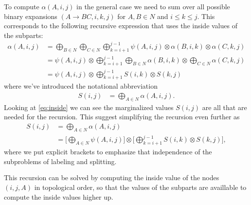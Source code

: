   To compute $\alpha(A, i, j)$ in the general case we need to sum over all possible binary expansions $(A \to B C, i, k, j)$ for $A, B \in N$ and $i \leq k \leq j$. This corresponds to the following recursive expression that uses the inside values of the subparts:
  \begin{align*}
  \label{eq:inside}
    \alpha(A, i, j)
      &= \bigoplus_{B \in N} \bigoplus_{C \in N} \bigoplus_{k=i+1}^{j-1} \psi(A, i, j) \otimes \alpha(B,i,k) \otimes \alpha(C,k,j) \\
      &= \psi(A, i, j) \otimes \bigoplus_{k=i+1}^{j-1} \bigoplus_{B \in N} \alpha(B,i,k) \otimes \bigoplus_{C \in N} \alpha(C,k,j) \\
      &= \psi(A, i, j) \otimes \bigoplus_{k=i+1}^{j-1} S(i,k) \otimes S(k,j)
  \end{align*}
  where we've introduced the notational abbreviation
  \begin{align*}
      S(i,j) &= \bigoplus_{A \in N} \alpha(A,i,j).
  \end{align*}
  Looking at \ref{eq:inside} we can see the marginalized values $S(i, j)$ are all that are needed for the recursion. This suggest simplifying the recursion even further as
  \begin{align*}
  \label{eq:inside-simplified}
    S(i, j)
      &= \bigoplus_{A \in N} \alpha(A,i,j) \\
      &= \Bigg[ \bigoplus_{A \in N} \psi(A, i, j) \Bigg] \otimes \Bigg[\bigoplus_{k=i+1}^{j-1} S(i,k) \otimes  S(k,j) \Bigg],
  \end{align*}
  where we put explicit brackets to emphasize that independence of the subproblems of labeling and splitting.

  This recursion can be solved by computing the inside value of the nodes $(i, j, A)$ in topological order, so that the values of the subparts are availlable to compute the inside values higher up.

